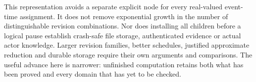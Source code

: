 This representation avoids a separate explicit node for every real-valued event-time assignment. It does not remove exponential growth in the number of distinguishable revision combinations. Nor does installing all children before a logical pause establish crash-safe file storage, authenticated evidence or actual actor knowledge. Larger revision families, better schedules, justified approximate reduction and durable storage require their own arguments and comparisons. The useful advance here is narrower: unfinished computation retains both what has been proved and every domain that has yet to be checked.
